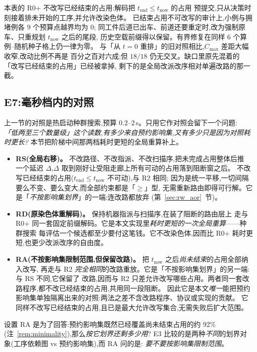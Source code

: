\documentclass[manuscript,screen,review]{acmart}
\newcommand{\RzeroPastLo}{0}
\newcommand{\ClosureAliveFrac}{92\%}
\begin{document}
本表的 R0+ 不改写已经结束的占用:解码把 \(t_{\mathrm{end}}\le t_{\mathrm{now}}\) 的占用
预提交,只从决策时刻接着排未开始的工序,并允许改染色体。
已结束占用不可改写的审计上,小例与拥堵例各 \(9\) 个预算点越界均为 \(\RzeroPastLo\);
同工件后道已出车、前道还要重定时,改为强制原车、只重规划 \(t_{\mathrm{now}}\) 之后的尾段,
历史空载前缀得以保留。有界修复在同样 \(6\) 个算例--随机种子格上仍一律为零。
与「从 \(t=0\) 重排」的旧对照相比,\(C_{\max}\) 差距大幅收窄,改动比例不再是
百分之百对六成;但 \(18/18\) 仍无交叉。缺口里原先混着的「改写已经结束的占用」已经被拿掉,
剩下的是全局改派改序相对单遍改路的那一截。

\subsection{E7:毫秒档内的对照}
\label{sec:cheap}

上一节的对照是热启动种群搜索,预算 \(0.2\)--\(2\)\,s。只用它作对照会留下一个问题:
\emph{「低两至三个数量级」这个读数,有多少来自预约影响集,又有多少只是因为对照耗时更长?}
本节把阶梯中间那两档耗时更短的全局重算补上。

\begin{itemize}[leftmargin=1.5em,itemsep=0.25em]
\item \textbf{RS(全局右移)。} 不改路径、不改指派、不改扫描序,把未完成占用整体后推
一个延迟 \(\Delta\),\(\Delta\) 取到刚好让受阻走廊上所有可动的占用落到阻断窗之后。
不改写已经结束的占用(\(t_{\mathrm{end}}\le t_{\mathrm{now}}\) 不可动),与 R2 相同;
因为是统一平移,一切间隔要么不变、要么变大,而全部约束都是「\(\ge\)」型,
无需重新路由即得可行解。它是「\emph{不按影响集划界}」的一端:连改路都放弃
(第~\ref{sec:rw_aor}~节)。
\item \textbf{RD(原染色体重解码)。} 保持机器指派与扫描序,在装了阻断的路由层上
走与 R0+ 同一套固定前缀解码。它是本文实现里\emph{耗时更短的一次全局重算}——种群搜索
每评估一个候选都至少要付这笔钱。它不改染色体,因而比 R0+ 耗时更短,也更少改派改序的自由度。
\item \textbf{RA(不按影响集限制范围,但保留改路)。} 把 \(t_{\mathrm{now}}\) 之后\emph{尚未结束}的占用全部纳入改写,
再走与 R2 \emph{完全相同}的改路重放。它是「不按影响集划界」的另一端:与 RS 不同,它保留了
改路,因而与 R2 只差允许改写哪些占用。两者同一套改路程序,都不改已经结束的占用,共用同一段阻断。
因此它是本文\emph{唯一}能把预约影响集单独隔离出来的对照:两法之差不含改路程序、协议或实现的贡献。
它同样不改写已经结束的占用,且已是最大允许改写集合,无需失败后扩大范围。
\end{itemize}

设置 RA 是为了回答:预约影响集既然已经覆盖尚未结束占用的约
\ClosureAliveFrac(注~\ref{rem:minimality}),那么\emph{按它划界还剩多少用}?
E3 比较的是两种\emph{不同}的划界对象(工序依赖图 vs 预约影响集),而 RA 问的是:
\emph{要不要按影响集限制范围}。
\end{document}
